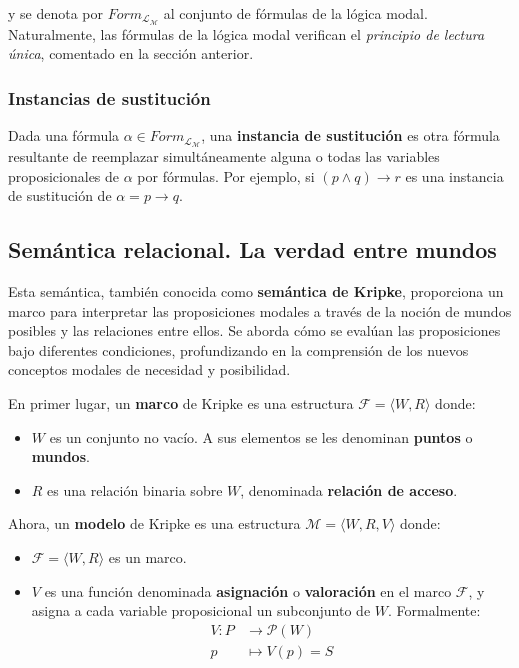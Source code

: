 y se denota por $Form_{\mathcal{L}_{\mathcal{M}}}$ al conjunto de fórmulas de la lógica modal. Naturalmente, las fórmulas de la lógica modal verifican el \textit{principio de lectura única}, comentado en la sección anterior.

\subsubsection{Instancias de sustitución}
Dada una fórmula $\alpha \in Form_{\mathcal{L}_{\mathcal{M}}}$, una \textbf{instancia de sustitución} es otra fórmula resultante de reemplazar simultáneamente alguna o todas las variables proposicionales de $\alpha$ por fórmulas. Por ejemplo, si $(p\land q) \rightarrow r$ es una instancia de sustitución de $\alpha = p \rightarrow q$.

\subsection{Semántica relacional. La verdad entre mundos}\label{subsection:lmodalsemantic}
Esta semántica, también conocida como \textbf{semántica de Kripke}, proporciona un marco para interpretar las proposiciones modales a través de la noción de mundos posibles y las relaciones entre ellos. Se aborda cómo se evalúan las proposiciones bajo diferentes condiciones, profundizando en la comprensión de los nuevos conceptos modales de necesidad y posibilidad.

\vspace{0.2cm}

\noindent
En primer lugar, un \textbf{marco} de Kripke es una estructura $\mathcal{F} = \langle W,R \rangle$ donde:

\begin{itemize}
    \item $W$ es un conjunto no vacío. A sus elementos se les denominan \textbf{puntos} o \textbf{mundos}.
    \item $R$ es una relación binaria sobre $W$, denominada \textbf{relación de acceso}.
\end{itemize}

\noindent
Ahora, un \textbf{modelo} de Kripke es una estructura $\mathcal{M} = \langle W,R,V \rangle$ donde:
\begin{itemize}
    \item $\mathcal{F} = \langle W,R \rangle$ es un marco.
    \item $V$ es una función denominada \textbf{asignación} o \textbf{valoración} en el marco $\mathcal{F}$, y asigna a cada variable proposicional un subconjunto de $W$. Formalmente:
    \begin{align*}
        V : P &\to \mathcal{P}(W) \\
        p &\mapsto V(p) = S
    \end{align*}
\end{itemize}

